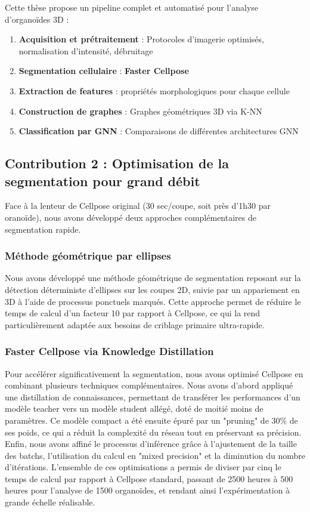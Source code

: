 Cette thèse propose un pipeline complet et automatisé pour l'analyse d'organoïdes 3D :

\begin{enumerate}
    \item \textbf{Acquisition et prétraitement} : Protocoles d'imagerie optimisés, normalisation d'intensité, débruitage
    \item \textbf{Segmentation cellulaire} : \textbf{Faster Cellpose} 
    \item \textbf{Extraction de features} : propriétés morphologiques pour chaque cellule
    \item \textbf{Construction de graphes} : Graphes géométriques 3D via K-NN
    \item \textbf{Classification par GNN} : Comparaisons de différentes architectures GNN
\end{enumerate}

\subsection{Contribution 2 : Optimisation de la segmentation pour grand débit}

Face à la lenteur de Cellpose original (30 sec/coupe, soit près d'1h30 par oranoïde), nous avons développé deux approches complémentaires de segmentation rapide.

\subsubsection{Méthode géométrique par ellipses}
Nous avons développé une méthode géométrique de segmentation reposant sur la détection déterministe d'ellipses sur les coupes 2D, suivie par un appariement en 3D à l'aide de processus ponctuels marqués. Cette approche permet de réduire le temps de calcul d'un facteur 10 par rapport à Cellpose, ce qui la rend particulièrement adaptée aux besoins de criblage primaire ultra-rapide.

\subsubsection{Faster Cellpose via Knowledge Distillation}
Pour accélérer significativement la segmentation, nous avons optimisé Cellpose en combinant plusieurs techniques complémentaires. Nous avons d'abord appliqué une distillation de connaissances, permettant de transférer les performances d'un modèle teacher vers un modèle student allégé, doté de moitié moins de paramètres. Ce modèle compact a été ensuite épuré par un "pruning" de 30\% de ses poids, ce qui a réduit la complexité du réseau tout en préservant sa précision. Enfin, nous avons affiné le processus d'inférence grâce à l'ajustement de la taille des batchs, l'utilisation du calcul en "mixed precision" et la diminution du nombre d'itérations. L'ensemble de ces optimisations a permis de diviser par cinq le temps de calcul par rapport à Cellpose standard, passant de 2500 heures à 500 heures pour l'analyse de 1500 organoïdes, et rendant ainsi l'expérimentation à grande échelle réalisable.

